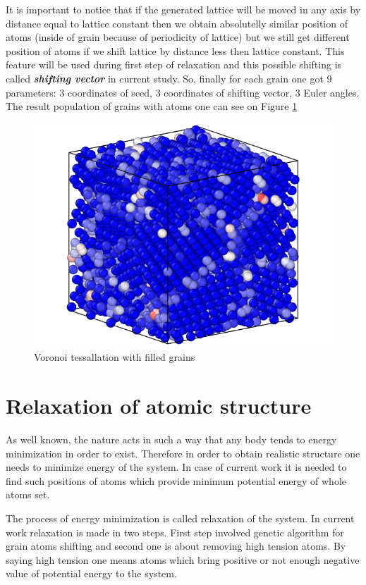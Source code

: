 \documentclass[12pt]{report}
\begin{document}
It is important to notice that if the generated lattice will be moved in any axis by distance equal to lattice constant then we obtain absolutelly similar position of atoms (inside of grain because of periodicity of lattice) but we still get different position of atoms if we shift lattice by distance less then lattice constant. This feature will be used during first step of relaxation and this possible shifting is called \textit{\textbf{shifting vector}} in current study. So, finally for each grain one got 9 parameters: 3 coordinates of seed, 3 coordinates of shifting vector, 3 Euler angles. The result population of grains with atoms one can see on Figure \ref{cubefilled}

\begin{figure}
    \centering
    \includegraphics[width=5.0in]{cube_filled}
    \caption{Voronoi tessallation with filled grains}
    \label{cubefilled}
\end{figure}

\section{Relaxation of atomic structure}

As well known, the nature acts in such a way that any body tends to energy minimization in order to exist. Therefore in order to obtain realistic structure one needs to minimize energy of the system. In case of current work it is needed to find such positions of atoms which provide minimum potential energy of whole atoms set.

The process of energy minimization is called relaxation of the system. In current work relaxation is made in two steps. First step involved genetic algorithm for grain atoms shifting and second one is about removing high tension atoms. By saying high tension one means atoms which bring positive or not enough negative value of potential energy to the system.
\end{document}
